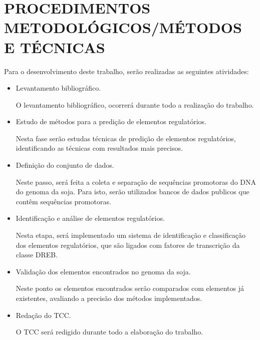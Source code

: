 \chapter{PROCEDIMENTOS METODOLÓGICOS/MÉTODOS E TÉCNICAS}

Para o desenvolvimento deste trabalho, serão realizadas as seguintes atividades:

\begin{itemize}
\item Levantamento bibliográfico.

O levantamento bibliográfico, ocorrerá durante todo a realização do trabalho.

\item Estudo de métodos para a predição de elementos regulatórios.

Nesta fase serão estudas técnicas de predição de elementos regulatórios, identificando as técnicas com resultados mais precisos.

\item Definição do conjunto de dados.

Neste passo, será feita a coleta e separação de sequências promotoras do DNA do genoma da soja. Para isto, serão utilizados bancos de dados publicos que contêm sequências promotoras.

\item Identificação e análise de elementos regulatórios.

Nesta etapa, será implementado um sistema de identificação e classificação dos elementos regulatórios, que são ligados com fatores de transcrição da classe DREB.

\item Validação dos elementos encontrados no genoma da soja.

Neste ponto os elementos encontrados serão comparados com elementos já existentes, avaliando a precisão dos métodos implementados.

\item Redação do TCC.

O TCC será redigido durante todo a elaboração do trabalho.

\end{itemize}

